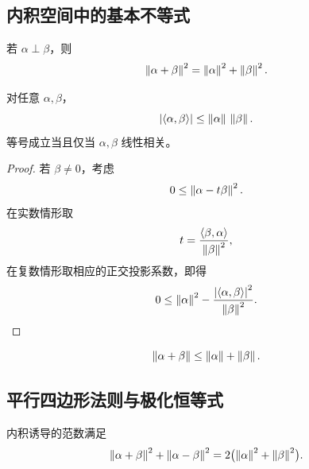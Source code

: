 \subsection{内积空间中的基本不等式}

\begin{theorem}[勾股定理]
若 $\alpha\perp\beta$，则
\begin{equation}
 \left\lVert \alpha+\beta\right\rVert^2=\left\lVert \alpha\right\rVert^2+\left\lVert \beta\right\rVert^2.
\end{equation}
\end{theorem}

\begin{theorem}
对任意 $\alpha,\beta$，
\begin{equation}
 \left\lvert \left\langle \alpha,\beta\right\rangle\right\rvert\leq\left\lVert \alpha\right\rVert\,\left\lVert \beta\right\rVert.
\end{equation}
等号成立当且仅当 $\alpha,\beta$ 线性相关。
\end{theorem}

\begin{proof}
若 $\beta\neq0$，考虑
\begin{equation}
 0\leq\left\lVert \alpha-t\beta\right\rVert^2.
\end{equation}
在实数情形取
\begin{equation}
 t=\frac{\left\langle \beta,\alpha\right\rangle}{\left\lVert \beta\right\rVert^2},
\end{equation}
在复数情形取相应的正交投影系数，即得
\begin{equation}
 0\leq\left\lVert \alpha\right\rVert^2-
 \frac{\left\lvert \left\langle \alpha,\beta\right\rangle\right\rvert^2}{\left\lVert \beta\right\rVert^2}.
\end{equation}
\end{proof}

\begin{corollary}[三角不等式]
\begin{equation}
 \left\lVert \alpha+\beta\right\rVert\leq\left\lVert \alpha\right\rVert+\left\lVert \beta\right\rVert.
\end{equation}
\end{corollary}

\subsection{平行四边形法则与极化恒等式}

\begin{theorem}[平行四边形法则]
内积诱导的范数满足
\begin{equation}
 \left\lVert \alpha+\beta\right\rVert^2+\left\lVert \alpha-\beta\right\rVert^2
 =2\bigl(\left\lVert \alpha\right\rVert^2+\left\lVert \beta\right\rVert^2\bigr).
\end{equation}
\end{theorem}

